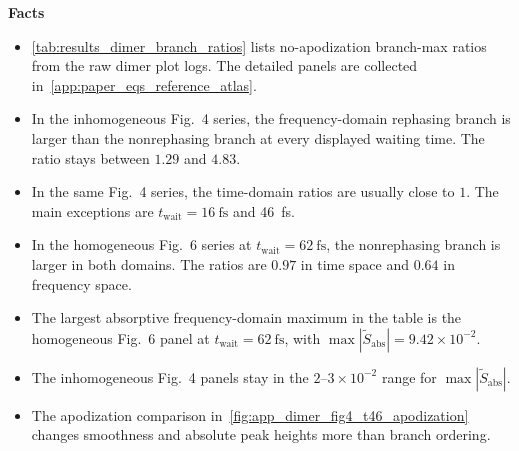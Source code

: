 \textbf{Facts}
\begin{itemize}
    \item \autoref{tab:results_dimer_branch_ratios} lists no-apodization branch-max ratios from the raw dimer plot logs. The detailed panels are collected in~\autoref{app:paper_eqs_reference_atlas}.
    \item In the inhomogeneous Fig.~4 series, the frequency-domain rephasing branch is larger than the nonrephasing branch at every displayed waiting time. The ratio stays between $1.29$ and $4.83$.
    \item In the same Fig.~4 series, the time-domain ratios are usually close to $1$. The main exceptions are $t_{\mathrm{wait}}=\SI{16}{\femto\second}$ and \SI{46}{\femto\second}.
    \item In the homogeneous Fig.~6 series at $t_{\mathrm{wait}}=\SI{62}{\femto\second}$, the nonrephasing branch is larger in both domains. The ratios are $0.97$ in time space and $0.64$ in frequency space.
    \item The largest absorptive frequency-domain maximum in the table is the homogeneous Fig.~6 panel at $t_{\mathrm{wait}}=\SI{62}{\femto\second}$, with $\max|\tilde{S}_{\mathrm{abs}}|=9.42\times10^{-2}$.
    \item The inhomogeneous Fig.~4 panels stay in the $2\text{--}3\times10^{-2}$ range for $\max|\tilde{S}_{\mathrm{abs}}|$.
    \item The apodization comparison in~\autoref{fig:app_dimer_fig4_t46_apodization} changes smoothness and absolute peak heights more than branch ordering.
\end{itemize}


